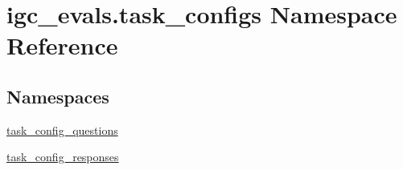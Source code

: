 \hypertarget{namespaceigc__evals_1_1task__configs}{}\section{igc\+\_\+evals.\+task\+\_\+configs Namespace Reference}
\label{namespaceigc__evals_1_1task__configs}
\subsection*{Namespaces}
\begin{DoxyCompactItemize}
\item 
 \hyperlink{namespaceigc__evals_1_1task__configs_1_1task__config__questions}{task\+\_\+config\+\_\+questions}
\item 
 \hyperlink{namespaceigc__evals_1_1task__configs_1_1task__config__responses}{task\+\_\+config\+\_\+responses}
\end{DoxyCompactItemize}

